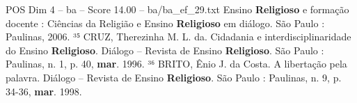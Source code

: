 \begin{textsample}{POS Dim 4 – ba – Score 14.00 – ba/ba\_ef\_29.txt}
Ensino \textbf{Religioso} e formação docente : Ciências da Religião e Ensino \textbf{Religioso} em diálogo.
São Paulo : Paulinas, 2006. ³⁵ CRUZ, Therezinha M.
L. da.
Cidadania e interdisciplinaridade do Ensino \textbf{Religioso}.
Diálogo – Revista de Ensino \textbf{Religioso}.
São Paulo : Paulinas, n. 1, p. 40, \textbf{mar}. 1996. ³⁶ BRITO, Ênio J. da Costa.
A libertação pela palavra.
Diálogo – Revista de Ensino \textbf{Religioso}.
São Paulo : Paulinas, n. 9, p. 34-36, \textbf{mar}. 1998.

\end{textsample}
